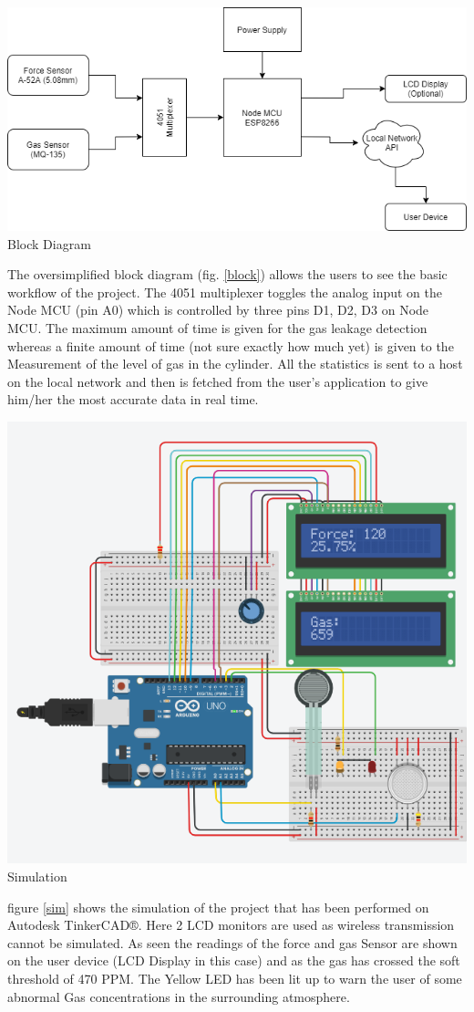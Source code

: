 \documentclass[conference]{IEEEtran}
\newenvironment{Figure}
  {\par\medskip\noindent\minipage{\linewidth}}
  {\endminipage\par\medskip}
\begin{document}
\begin{Figure}
    \centering
    \includegraphics[width=\linewidth]{Images/BlockDiagram.png}
    \label{block}
    \figurename{Block Diagram}
\end{Figure}
The oversimplified block diagram (fig. \ref{block}) allows the users to
see the basic workflow of the project. The 4051
multiplexer toggles the analog input on the Node MCU
(pin A0) which is controlled by three pins D1, D2, D3
on Node MCU. The maximum amount of time is given for
the gas leakage detection whereas a finite amount of
time (not sure exactly how much yet) is given to the
Measurement of the level of gas in the cylinder. All
the statistics is sent to a host on the local network
and then is fetched from the user's application to give
him/her the most accurate data in real time.
\begin{Figure}
    \centering
    \includegraphics[width=\linewidth]{Images/Simulation.png}
    \label{sim}
    \figurename{Simulation}
\end{Figure}
figure \ref{sim} shows the simulation of the project that
has been performed on Autodesk TinkerCAD®. Here 2 LCD
monitors are used as wireless transmission cannot be
simulated. As seen the readings of the force and gas
Sensor are shown on the user device (LCD Display in
this case) and as the gas has crossed the soft
threshold of 470 PPM. The Yellow LED has been lit
up to warn the user of some abnormal Gas concentrations
in the surrounding atmosphere.
\end{document}
